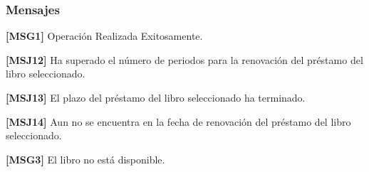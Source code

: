 \subsubsection{Mensajes}
	\begin{Citemize}
		\item {\bf [MSG1]} Operación Realizada Exitosamente.
		\item {\bf [MSJ12]} Ha superado el número de periodos para la renovación del préstamo del libro seleccionado.
		\item {\bf [MSJ13]} El plazo del préstamo del libro seleccionado ha terminado.
		\item {\bf [MSJ14]} Aun no se encuentra en la fecha de renovación del préstamo del libro seleccionado.
		\item {\bf [MSG3]} El libro no está disponible.
		
		
		
	\end{Citemize}